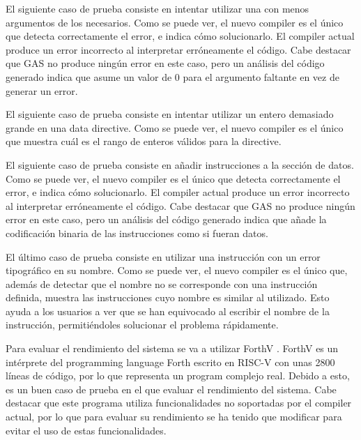 \evalres

El siguiente caso de prueba consiste en intentar utilizar una
 con menos argumentos de los necesarios.
\evalresref Como se puede ver, el nuevo \gls{compiler} es el único que detecta
correctamente el error, e indica cómo solucionarlo. El \gls{compiler} actual
produce un error incorrecto al interpretar erróneamente el código. Cabe destacar
que GAS no produce ningún error en este caso, pero un análisis del código
generado indica que asume un valor de 0 para el argumento faltante en vez de
generar un error.

\evalres

El siguiente caso de prueba consiste en intentar utilizar un entero demasiado
grande en una \gls{data directive}. \evalresref Como se puede ver, el nuevo
\gls{compiler} es el único que muestra cuál es el rango de enteros válidos para
la \gls{directive}.

\evalres

El siguiente caso de prueba consiste en añadir instrucciones a la sección de
datos. \evalresref Como se puede ver, el nuevo \gls{compiler} es el único que
detecta correctamente el error, e indica cómo solucionarlo. El \gls{compiler}
actual produce un error incorrecto al interpretar erróneamente el código. Cabe
destacar que GAS no produce ningún error en este caso, pero un análisis del
código generado indica que añade la codificación binaria de las instrucciones
como si fueran datos.

\evalres

El último caso de prueba consiste en utilizar una instrucción con un error
tipográfico en su nombre. \evalresref Como se puede ver, el nuevo \gls{compiler}
es el único que, además de detectar que el nombre no se corresponde con una
instrucción definida, muestra las instrucciones cuyo nombre es similar al
utilizado. Esto ayuda a los usuarios a ver que se han equivocado al escribir el
nombre de la instrucción, permitiéndoles solucionar el problema rápidamente.

\evalres


Para evaluar el rendimiento del sistema se va a utilizar ForthV
\parencite{ForthV}. ForthV es un intérprete del \gls{programming language} Forth
escrito en  RISC-V \parencite{RISC-V} con unas
2800 líneas de código, por lo que representa un \gls{program} complejo real.
Debido a esto, es un buen caso de prueba en el que evaluar el rendimiento del
sistema. Cabe destacar que este programa utiliza funcionalidades no soportadas
por el \gls{compiler} actual, por lo que para evaluar su rendimiento se ha
tenido que modificar para evitar el uso de estas funcionalidades.

